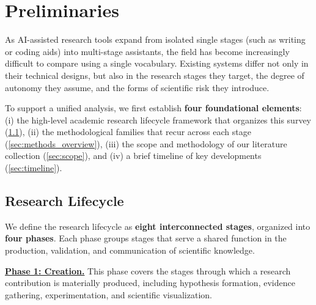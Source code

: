 \section{Preliminaries}
\label{sec:preliminaries}

As AI-assisted research tools expand from isolated single stages (such as writing or coding aids) into multi-stage assistants, the field has become increasingly difficult to compare using a single vocabulary. Existing systems differ not only in their technical designs, but also in the research stages they target, the degree of autonomy they assume, and the forms of scientific risk they introduce. 

To support a unified analysis, we first establish \textbf{four foundational elements}: (i) the high-level academic research lifecycle framework that organizes this survey (\cref{sec:lifecycle}), (ii) the methodological families that recur across each stage (\cref{sec:methods_overview}), (iii) the scope and methodology of our literature collection (\cref{sec:scope}), and (iv) a brief timeline of key developments (\cref{sec:timeline}).



\subsection{Research Lifecycle}
\label{sec:lifecycle}

We define the research lifecycle as \textbf{eight interconnected stages}, organized into \textbf{four phases}. Each phase groups stages that serve a shared function in the production, validation, and communication of scientific knowledge.

\vspace{6pt}
\noindent\underline{\textbf{Phase 1: Creation.}} This phase covers the stages through which a research contribution is materially produced, including hypothesis formation, evidence gathering, experimentation, and scientific visualization.



